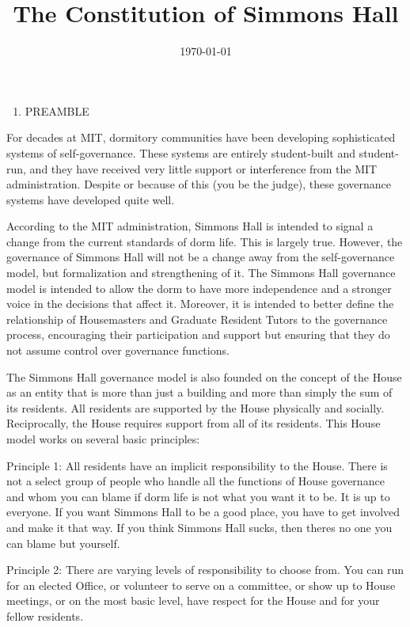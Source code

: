 \documentclass[letterpaper]{article}
\title{The Constitution of Simmons Hall}
\date{\today}
\newcommand\liststyleWWNumv{%
\renewcommand\theenumi{\Roman{enumi}}
\renewcommand\theenumii{\arabic{enumii}}
\renewcommand\theenumiii{\arabic{enumiii}}
\renewcommand\theenumiv{\arabic{enumiv}}
\renewcommand\labelenumi{\theenumi.}
\renewcommand\labelenumii{\theenumii.}
\renewcommand\labelenumiii{\theenumiii)}
\renewcommand\labelenumiv{\theenumiv.}
}
\begin{document}
\maketitle
\liststyleWWNumv
\begin{enumerate}
\item\setcounter{page}{1}\pagestyle{Standard}

PREAMBLE 
\end{enumerate}
For decades at MIT, dormitory communities have been developing
sophisticated systems of self-governance. These systems are entirely
student-built and student-run, and they have received very little
support or interference from the MIT administration. Despite or because
of this (you be the judge), these governance systems have developed
quite well.

According to the MIT administration, Simmons Hall is intended to signal
a change from the current standards of dorm life. This is largely true.
However, the governance of Simmons Hall will not be a change away from
the self-governance model, but formalization and strengthening of it.
The Simmons Hall governance model is intended to allow the dorm to have
more independence and a stronger voice in the decisions that affect it.
Moreover, it is intended to better define the relationship of
Housemasters and Graduate Resident Tutors to the governance process,
encouraging their participation and support but ensuring that they do
not assume control over governance functions.

The Simmons Hall governance model is also founded on the concept of the
House as an entity that is more than just a building and more than
simply the sum of its residents. All residents are supported by the
House physically and socially. Reciprocally, the House requires support
from all of its residents. This House model works on several basic
principles:

Principle 1: All residents have an implicit responsibility to the House.
There is not a select group of people who handle all the functions of
House governance and whom you can blame if dorm life is not what you
want it to be. It is up to everyone. If you want Simmons Hall to be a
good place, you have to get involved and make it that way. If you think
Simmons Hall sucks, then there{\textquotesingle}s no one you can blame
but yourself.

Principle 2: There are varying levels of responsibility to choose from.
You can run for an elected Office, or volunteer to serve on a
committee, or show up to House meetings, or on the most basic level,
have respect for the House and for your fellow residents. 
\end{document}
